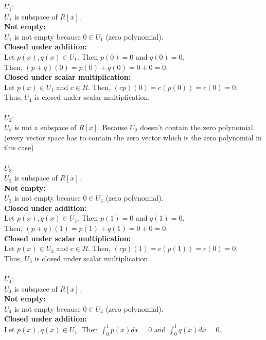 \documentclass{article}
\begin{document}
\(U_1\): \\
\(U_1\) is subspace of \(R[x]\). \\
\textbf{Not empty:} \\
\(U_1\) is not empty because \(0 \in U_1\) (zero polynomial). \\
\textbf{Closed under addition:} \\
Let \(p(x), q(x) \in U_1\). Then \(p(0) = 0\) and \(q(0) = 0\). \\
Then, \((p + q)(0) = p(0) + q(0) = 0 + 0 = 0\). \\
\textbf{Closed under scalar multiplication:} \\
Let \(p(x) \in U_1\) and \(c \in R\). Then, \((cp)(0) = c(p(0)) = c(0) = 0\). \\
Thus, \(U_1\) is closed under scalar multiplication. \\
\\
\(U_2\): \\
\(U_2\) is not a subspace of \(R[x]\). Because \(U_2\) doesn't contain the zero polynomial. (every vector space has to contain the zero vector which is the zero polynomial in this case) \\
\\
\(U_3\): \\
\(U_3\) is subspace of \(R[x]\). \\
\textbf{Not empty:} \\
\(U_3\) is not empty because \(0 \in U_3\) (zero polynomial). \\
\textbf{Closed under addition:} \\
Let \(p(x), q(x) \in U_3\). Then \(p(1) = 0\) and \(q(1) = 0\). \\
Then, \((p + q)(1) = p(1) + q(1) = 0 + 0 = 0\). \\
\textbf{Closed under scalar multiplication:} \\
Let \(p(x) \in U_3\) and \(c \in R\). Then, \((cp)(1) = c(p(1)) = c(0) = 0\). \\
Thus, \(U_3\) is closed under scalar multiplication. \\
\\
\(U_4\): \\
\(U_4\) is subspace of \(R[x]\). \\
\textbf{Not empty:} \\
\(U_4\) is not empty because \(0 \in U_4\) (zero polynomial). \\
\textbf{Closed under addition:} \\
Let \(p(x), q(x) \in U_4\). Then \(\int_0^1 p(x) dx = 0\) and \(\int_0^1 q(x) dx = 0\). \\
\end{document}
